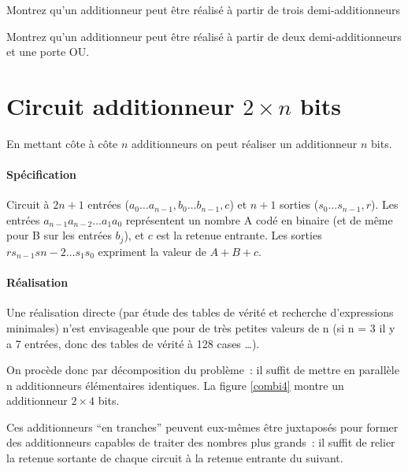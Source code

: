 \begin{exercice}{} Montrez qu'un additionneur 
peut \^etre r\'ealis\'e \`a partir de trois demi-additionneurs
\end{exercice}

\begin{exercice}{} Montrez qu'un additionneur 
peut \^etre r\'ealis\'e \`a partir de deux demi-additionneurs et une
porte OU.
\end{exercice}

\section{Circuit additionneur $2 \times n$ bits}

En mettant c\^ote \`a c\^ote $n$ additionneurs on peut r\'ealiser un
additionneur $n$ bits.

\paragraph{Sp\'ecification} Circuit \`a $2n+1$ entr\'ees ($a_0 \ldots a_{n-1},
b_0 \ldots b_{n-1}, c$) et  $n+1$ sorties ($s_0 \ldots s_{n-1},r$). 
Les entr\'ees $a_{n-1}a_{n-2}\ldots a_1 a_0$  repr\'esentent un nombre A cod\'e 
en binaire (et de m\^eme pour B sur les entr\'ees $b_j$), et $c$ est la retenue
entrante. Les sorties $rs_{n-1}s{n-2}\ldots s_1 s_0$ expriment la valeur de
$A+B+c$.

\paragraph{R\'ealisation} Une r\'ealisation directe (par \'etude des
tables de v\'erit\'e et recherche d'expressions minimales) n'est
envisageable que pour de tr\`es petites valeurs de n (si n = 3 il y a
7 entr\'ees, donc des tables de v\'erit\'e \`a 128 cases \ldots).

On proc\`ede donc par d\'ecomposition du problème~: il suffit de
mettre en parall\`ele n additionneurs \'el\'ementaires identiques.  La
figure \ref{combi4} montre un additionneur $2 \times 4$ bits.


\begin{remarque}{} Ces additionneurs ``en tranches'' peuvent eux-m\^emes
\^etre juxtapos\'es pour former des additionneurs capables de traiter
des nombres plus grands~: il suffit de relier la retenue sortante
de chaque circuit \`a la retenue entrante du suivant.
\end{remarque}

